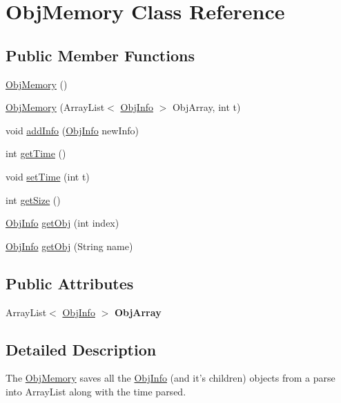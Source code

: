 \hypertarget{classObjMemory}{
\section{ObjMemory Class Reference}
\label{classObjMemory}
}
\subsection*{Public Member Functions}
\begin{DoxyCompactItemize}
\item 
\hyperlink{classObjMemory_a0536b9096b54697218eecf2f1da3c1b4}{ObjMemory} ()
\item 
\hyperlink{classObjMemory_a1868167dda44f86ec490e9e06cfd7bca}{ObjMemory} (ArrayList$<$ \hyperlink{classObjInfo}{ObjInfo} $>$ ObjArray, int t)
\item 
void \hyperlink{classObjMemory_a8d90e6f1f96617d419136240cac1055d}{addInfo} (\hyperlink{classObjInfo}{ObjInfo} newInfo)
\item 
int \hyperlink{classObjMemory_a6d60d4dbeb76b1acecedd12aa5aa9a7e}{getTime} ()
\item 
void \hyperlink{classObjMemory_a51b9a4241e85b64e7de03ceb23fa49c4}{setTime} (int t)
\item 
int \hyperlink{classObjMemory_aabec8724e9dcf43c1d74e07da32db6c4}{getSize} ()
\item 
\hyperlink{classObjInfo}{ObjInfo} \hyperlink{classObjMemory_a239534ad3fd257bca199db862298f701}{getObj} (int index)
\item 
\hyperlink{classObjInfo}{ObjInfo} \hyperlink{classObjMemory_ae4fb653adb8f1f399b4c5abfd824fa7a}{getObj} (String name)
\end{DoxyCompactItemize}
\subsection*{Public Attributes}
\begin{DoxyCompactItemize}
\item 
\hypertarget{classObjMemory_a7697b1cf169db1b511c22ef743c566c1}{
ArrayList$<$ \hyperlink{classObjInfo}{ObjInfo} $>$ {\bfseries ObjArray}}
\label{classObjMemory_a7697b1cf169db1b511c22ef743c566c1}

\end{DoxyCompactItemize}


\subsection{Detailed Description}
The \hyperlink{classObjMemory}{ObjMemory} saves all the \hyperlink{classObjInfo}{ObjInfo} (and it's children) objects from a parse into ArrayList along with the time parsed. 

